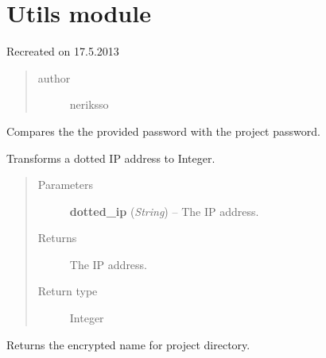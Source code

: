 \documentclass[letterpaper,10pt,english]{sphinxmanual}
\begin{document}
\section{Utils module}
\label{utils:utils-module}\label{utils:module-utils}\label{utils::doc}
Recreated on 17.5.2013
\begin{quote}\begin{description}
\item[{author}] \leavevmode
neriksso

\end{description}\end{quote}

\begin{fulllineitems}
\label{utils:utils.CheckProjectPassword}
Compares the the provided password with the project password.

\end{fulllineitems}


\begin{fulllineitems}
\label{utils:utils.DottedIPToInt}
Transforms a dotted IP address to Integer.
\begin{quote}\begin{description}
\item[{Parameters}] \leavevmode
\textbf{dotted\_ip} (\emph{String}) -- The IP address.

\item[{Returns}] \leavevmode
The IP address.

\item[{Return type}] \leavevmode
Integer

\end{description}\end{quote}

\end{fulllineitems}


\begin{fulllineitems}
\label{utils:utils.GetEncryptedDirName}
Returns the encrypted name for project directory.

\end{fulllineitems}
\end{document}
